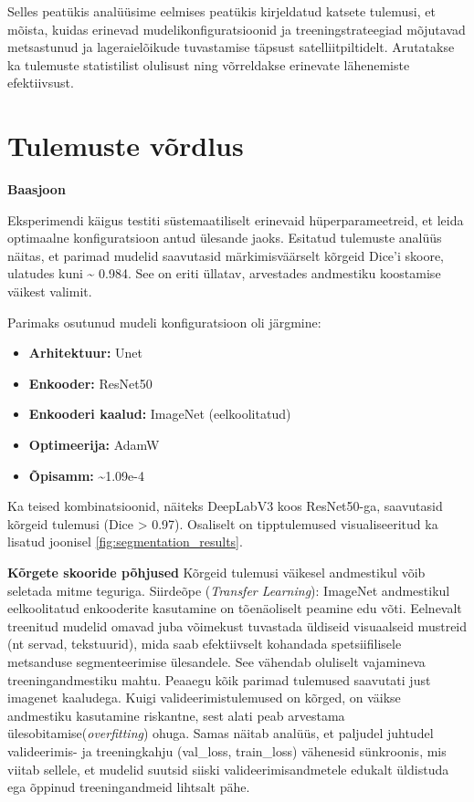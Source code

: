 Selles peatükis analüüsime eelmises peatükis kirjeldatud katsete tulemusi, et mõista, kuidas erinevad mudelikonfiguratsioonid ja treeningstrateegiad mõjutavad metsastunud ja lageraielõikude tuvastamise täpsust satelliitpiltidelt. Arutatakse ka tulemuste statistilist olulisust ning võrreldakse erinevate lähenemiste efektiivsust.
\section{Tulemuste võrdlus}
\textbf{Baasjoon}

Eksperimendi käigus testiti süstemaatiliselt erinevaid hüperparameetreid, et leida optimaalne konfiguratsioon antud ülesande jaoks. 
Esitatud tulemuste analüüs näitas, et parimad mudelid
saavutasid märkimisväärselt kõrgeid Dice'i skoore, ulatudes kuni \textasciitilde
0.984. See on eriti üllatav, arvestades andmestiku koostamise väikest valimit.

Parimaks osutunud mudeli konfiguratsioon oli järgmine:
\begin{itemize}
  \item \textbf{Arhitektuur:} Unet
  \item \textbf{Enkooder:} ResNet50
  \item \textbf{Enkooderi kaalud:} ImageNet (eelkoolitatud)
  \item \textbf{Optimeerija:} AdamW
  \item \textbf{Õpisamm:} \textasciitilde 1.09e-4
\end{itemize}

Ka teised kombinatsioonid,
näiteks DeepLabV3 koos ResNet50-ga, saavutasid kõrgeid tulemusi (Dice > 0.97).
Osaliselt on tipptulemused visualiseeritud ka lisatud joonisel \ref{fig:segmentation_results}.

\textbf{Kõrgete skooride põhjused}
Kõrgeid tulemusi väikesel andmestikul võib seletada mitme teguriga.
Siirdeõpe (\textit{Transfer Learning}): ImageNet andmestikul eelkoolitatud enkooderite
kasutamine on tõenäoliselt peamine edu võti. Eelnevalt treenitud mudelid omavad
juba võimekust tuvastada üldiseid visuaalseid mustreid (nt servad, tekstuurid),
mida saab efektiivselt kohandada spetsiifilisele metsanduse segmenteerimise
ülesandele. See vähendab oluliselt vajamineva treeningandmestiku mahtu. Peaaegu
kõik parimad tulemused saavutati just imagenet kaaludega. 
Kuigi valideerimistulemused on kõrged, on väikse andmestiku kasutamine riskantne, sest alati peab arvestama ülesobitamise(\textit{overfitting}) ohuga. Samas näitab analüüs, et paljudel juhtudel valideerimis- ja treeningkahju
(val\_loss, train\_loss) vähenesid sünkroonis, mis viitab sellele, et mudelid
suutsid siiski valideerimisandmetele edukalt üldistuda ega õppinud
treeningandmeid lihtsalt pähe.

